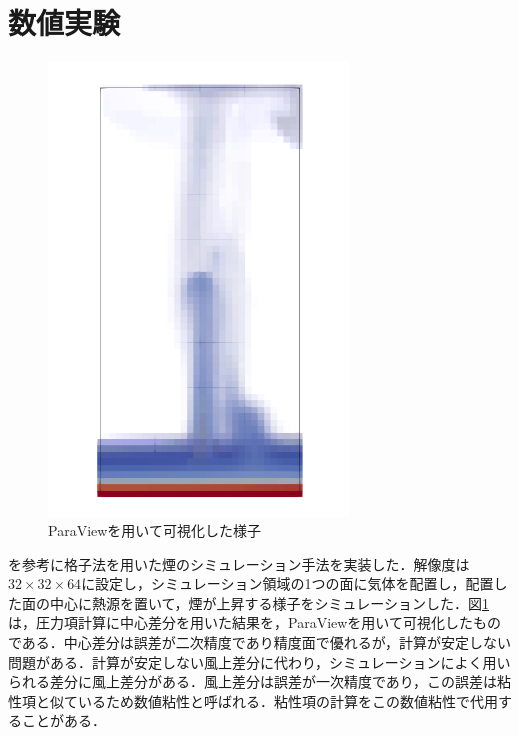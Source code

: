 \documentclass[10pt,a4paper,notitlepage,oneside,twocolumn]{abst_jsarticle}
\begin{document}
\section{数値実験}
\begin{figure}[h]
\includegraphics[width=80mm]{center_smoke.png}
\caption{ParaViewを用いて可視化した様子}
\label{fig:fig1}
\end{figure}
\cite{fedkiew}を参考に格子法を用いた煙のシミュレーション手法を実装した．解像度は$32\times32\times64$に設定し，シミュレーション領域の1つの面に気体を配置し，配置した面の中心に熱源を置いて，煙が上昇する様子をシミュレーションした．図\ref{fig:fig1}は，圧力項計算に中心差分を用いた結果を，ParaViewを用いて可視化したものである．中心差分は誤差が二次精度であり精度面で優れるが，計算が安定しない問題がある．計算が安定しない風上差分に代わり，シミュレーションによく用いられる差分に風上差分がある．風上差分は誤差が一次精度であり，この誤差は粘性項と似ているため数値粘性と呼ばれる．粘性項の計算をこの数値粘性で代用することがある．
\end{document}
